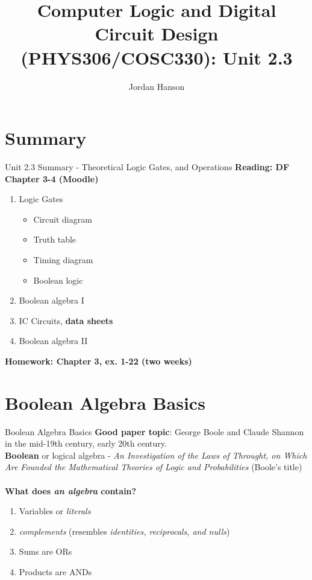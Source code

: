 \documentclass{beamer}
\title{Computer Logic and Digital Circuit Design (PHYS306/COSC330): Unit 2.3}
\author{Jordan Hanson}
\institute{Whittier College Department of Physics and Astronomy}
\begin{document}
\maketitle

\section{Summary}

\begin{frame}{Unit 2.3 Summary - Theoretical Logic Gates, and Operations}
\textbf{Reading: DF Chapter 3-4 (Moodle)}
\begin{enumerate}
\item Logic Gates
\begin{itemize}
\item Circuit diagram
\item Truth table
\item Timing diagram
\item Boolean logic
\end{itemize}
\item \alert{Boolean algebra I}
\item IC Circuits, \textbf{data sheets}
\item \alert{Boolean algebra II}
\end{enumerate}
\textbf{Homework: Chapter 3, ex. 1-22 (two weeks)}
\end{frame}

\section{Boolean Algebra Basics}

\begin{frame}{Boolean Algebra Basics}
\textbf{Good paper topic}: George Boole and Claude Shannon in the mid-19th century, early 20th century. \\ \vspace{0.5cm}
\textbf{\alert{Boolean}} or logical algebra - \textit{An Investigation of the Laws of Throught, on Which Are Founded the Mathematical Theories of Logic and Probabilities} (Boole's title) \\ \hrulefill \\
\textbf{What does \textit{an algebra} contain?}
\begin{enumerate}
\item Variables or \textit{literals}
\item \textit{complements} (resembles \textit{identities, reciprocals, and nulls})
\item Sums are ORs
\item Products are ANDs
\end{enumerate}
\end{frame}
\end{document}
